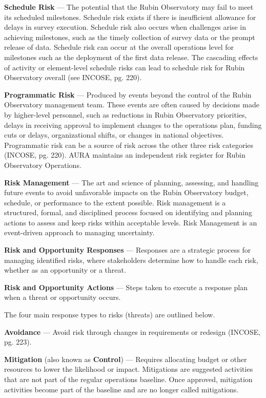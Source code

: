 \textbf{Schedule Risk} ---
The potential that the Rubin Observatory may fail to meet its scheduled milestones. Schedule risk exists if there is insufficient allowance for delays in survey execution. Schedule risk also occurs when challenges arise in achieving milestones, such as the timely collection of survey data or the prompt release of data.
Schedule risk can occur at the overall operations level for milestones such as the deployment of the first data release. The cascading effects of activity or element-level schedule risks can lead to schedule risk for Rubin Observatory overall (see INCOSE, pg. 220).

\textbf{Programmatic Risk} ---
Produced by events beyond the control of the Rubin Observatory management team. These events are often caused by decisions made by higher-level personnel, such as reductions in Rubin Observatory priorities, delays in receiving approval to implement changes to the operations plan, funding cuts or delays, organizational shifts, or changes in national objectives.
Programmatic risk can be a source of risk across the other three risk categories (INCOSE, pg. 220). 
AURA maintains an independent risk register for Rubin Observatory Operations.

\textbf{Risk Management} ---
The art and science of planning, assessing, and handling future events to avoid unfavorable impacts on the Rubin Observatory budget, schedule, or performance to the extent possible.
Risk management is a structured, formal, and disciplined process focused on identifying and planning actions to assess and keep risks within acceptable levels.
Risk Management is an event-driven approach to managing uncertainty.

\textbf{Risk and Opportunity Responses} ---
Responses are a strategic process for managing identified risks, where stakeholders determine how to handle each risk, whether as an opportunity or a threat.

\textbf{Risk and Opportunity Actions} ---
Steps taken to execute a response plan when a threat or opportunity occurs.

The four main response types to risks (threats) are outlined below.

\textbf{Avoidance} ---
Avoid risk through changes in requirements or redesign (INCOSE, pg. 223).

\textbf{Mitigation} (also known as \textbf{Control}) ---
Requires allocating budget or other resources to lower the likelihood or impact. Mitigations are suggested activities that are not part of the regular operations baseline. Once approved, mitigation activities become part of the baseline and are no longer called mitigations.

